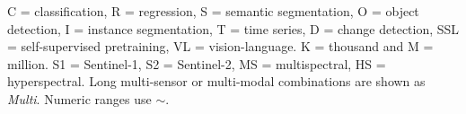 \vspace{-0.3em}
\begin{center}
\begin{minipage}{0.988\textwidth}
\fontsize{5.7}{6.8}\selectfont
C = classification, R = regression, S = semantic segmentation, O = object detection, I = instance segmentation, T = time series, D = change detection, SSL = self-supervised pretraining, VL = vision-language. K = thousand and M = million. S1 = Sentinel-1, S2 = Sentinel-2, MS = multispectral, HS = hyperspectral. Long multi-sensor or multi-modal combinations are shown as \emph{Multi}. Numeric ranges use $\sim$.
\end{minipage}
\end{center}
\endgroup
\restoregeometry